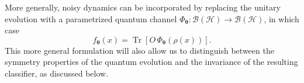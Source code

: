 \documentclass[aps,pra,reprint,superscriptaddress,longbibliography]{revtex4-2}
\newcommand{\tr}{\operatorname{Tr}}
\newcommand{\Hi}{\mathcal{H}}
\begin{document}
More generally, noisy dynamics can be incorporated by replacing the unitary
evolution with a parametrized quantum channel
\(\Phi_{\boldsymbol{\theta}}:\mathcal{B}(\Hi)\rightarrow
\mathcal{B}(\Hi)\), in which case
\begin{equation}
    f_{\boldsymbol{\theta}}(x)
    =
    \tr\!\left[
        O\,\Phi_{\boldsymbol{\theta}}(\rho(x))
    \right].
\end{equation}
This more general formulation will also allow us to distinguish between the
symmetry properties of the quantum evolution and the invariance of the
resulting classifier, as discussed below.

\end{document}
